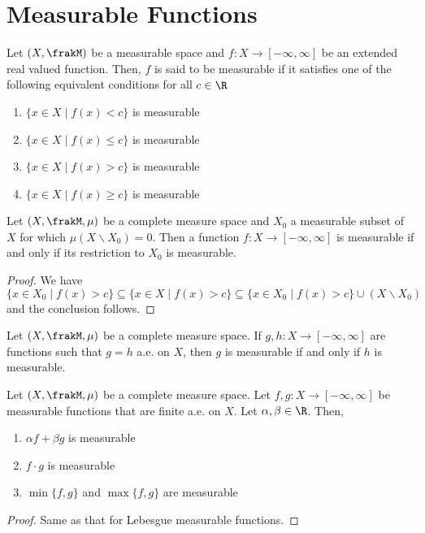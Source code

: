\section{Measurable Functions}

\begin{definition}
    Let $(X,\frakM)$ be a measurable space and $f: X\to[-\infty,\infty]$ be an extended real valued function. Then, $f$ is said to be measurable if it satisfies one of the following equivalent conditions for all $c\in\R$
    \begin{enumerate}[label=(\alph*)]
    \item $\{x\in X\mid f(x) < c\}$ is measurable
    \item $\{x\in X\mid f(x) \le c\}$ is measurable
    \item $\{x\in X\mid f(x) > c\}$ is measurable
    \item $\{x\in X\mid f(x) \ge c\}$ is measurable
    \end{enumerate}
\end{definition}

\begin{proposition}
    Let $(X,\frakM,\mu)$ be a complete measure space and $X_0$ a measurable subset of $X$ for which $\mu(X\backslash X_0) = 0$. Then a function $f: X\to[-\infty,\infty]$ is measurable if and only if its restriction to $X_0$ is measurable.
\end{proposition}
\begin{proof}
    We have 
    \begin{equation*}
        \{x\in X_0\mid f(x) > c\}\subseteq\{x\in X\mid f(x) > c\}\subseteq\{x\in X_0\mid f(x) > c\}\cup(X\backslash X_0)
    \end{equation*}
    and the conclusion follows.
\end{proof}

\begin{corollary}
    Let $(X,\frakM,\mu)$ be a complete measure space. If $g,h: X\to[-\infty,\infty]$ are functions such that $g = h$ a.e. on $X$, then $g$ is measurable if and only if $h$ is measurable.
\end{corollary}

\begin{proposition}
    Let $(X,\frakM,\mu)$ be a complete measure space. Let $f,g: X\to[-\infty,\infty]$ be measurable functions that are finite a.e. on $X$. Let $\alpha,\beta\in\R$. Then, 
    \begin{enumerate}[label=(\alph*)]
    \item $\alpha f + \beta g$ is measurable
    \item $f\cdot g$ is measurable 
    \item $\min\{f,g\}$ and $\max\{f,g\}$ are measurable
    \end{enumerate}
\end{proposition}
\begin{proof}
    Same as that for Lebesgue measurable functions.
\end{proof}

